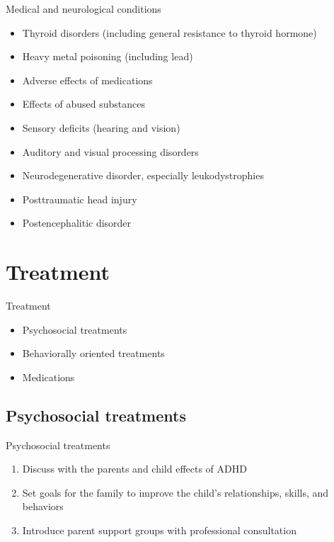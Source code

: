 \documentclass{beamer}
\begin{document}
\begin{frame}{Medical and neurological conditions}
\begin{itemize}
    \item Thyroid disorders (including general resistance to thyroid hormone)
    \item Heavy metal poisoning (including lead)
    \item Adverse effects of medications
    \item Effects of abused substances
    \item Sensory deficits (hearing and vision)
    \item Auditory and visual processing disorders
    \item Neurodegenerative disorder, especially leukodystrophies
    \item Posttraumatic head injury
    \item Postencephalitic disorder
\end{itemize}
\end{frame}

\section{Treatment}
\begin{frame}{Treatment}
\begin{itemize}
    \item Psychosocial treatments
    \item Behaviorally oriented treatments
    \item Medications
\end{itemize}
\end{frame}

\subsection{Psychosocial treatments}
\begin{frame}{Psychosocial treatments}
\begin{enumerate}
    \item Discuss with the parents and child effects of ADHD
    \item Set goals for the family to improve the child's relationships, skills, and behaviors
    \item Introduce parent support groups with professional consultation
\end{enumerate}
\end{frame}
\end{document}
